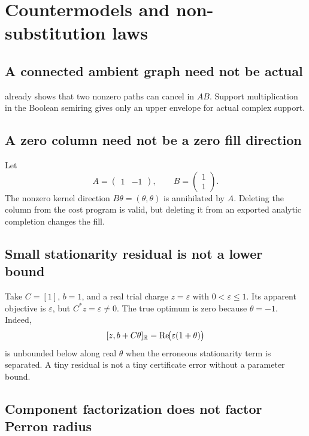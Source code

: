 \section{Countermodels and non-substitution laws}
\label{sec:countermodels}

\subsection{A connected ambient graph need not be actual}

 already shows that two nonzero paths can
cancel in \(AB\). Support multiplication in the Boolean semiring gives
only an upper envelope for actual complex support.

\subsection{A zero column need not be a zero fill direction}

Let
\[
 A=\begin{pmatrix}1&-1\end{pmatrix},
 \qquad
 B=\begin{pmatrix}1\\1\end{pmatrix}.
\]
The nonzero kernel direction \(B\theta=(\theta,\theta)\) is annihilated
by \(A\). Deleting the column from the cost program is valid, but
deleting it from an exported analytic completion changes the fill.

\subsection{Small stationarity residual is not a lower bound}

Take \(C=[1]\), \(b=1\), and a real trial charge
\(z=\varepsilon\) with \(0<\varepsilon\le1\). Its apparent objective is
\(\varepsilon\), but
\(C^*z=\varepsilon\ne0\). The true optimum is zero because
\(\theta=-1\). Indeed,
\[
 [z,b+C\theta]_{\mathbb R}
 =
 \operatorname{Re}\!\bigl(\varepsilon(1+\theta)\bigr)
\]
is unbounded below along real \(\theta\) when the erroneous
stationarity term is separated. A tiny residual is not a tiny
certificate error without a parameter bound.

\subsection{Component factorization does not factor Perron radius}

